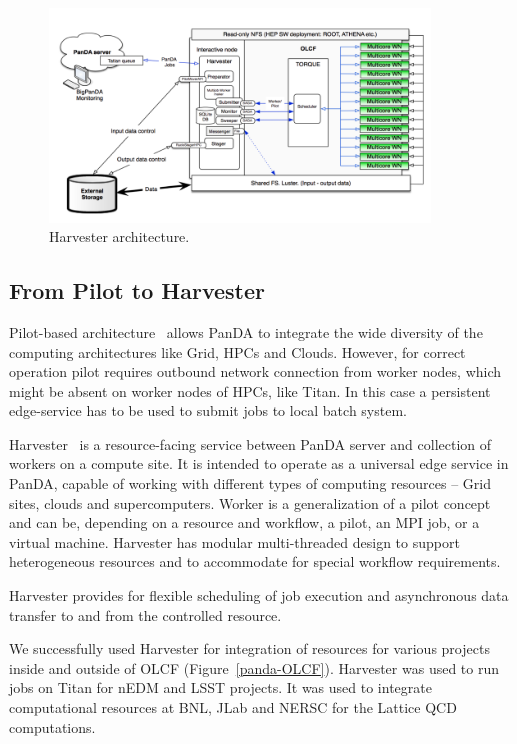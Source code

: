 \documentclass{webofc}
\begin{document}
\begin{figure}
  \centering
  \includegraphics[width=0.90\textwidth]{figures/Panda_at_OLCF.png}
  \caption{Harvester architecture.}
  \label{fig:panda-OLCF}
\end{figure}

\subsection{From Pilot to Harvester}

Pilot-based architecture~\cite{Nilsson_2008} allows PanDA to integrate the wide diversity of the computing architectures like Grid,  HPCs and Clouds. However, for correct operation pilot requires outbound network connection from worker nodes, which might be absent on worker nodes of HPCs, like Titan. In this case a persistent edge-service has to be used to submit jobs to local batch system.

Harvester~\cite{Harvester} is a resource-facing service between PanDA server and collection of workers on a compute site. It is intended to operate as a universal edge service in PanDA, capable of working with different types of computing resources -- Grid sites, clouds and supercomputers. Worker is a generalization of a pilot concept and can be, depending on a resource and workflow, a pilot, an MPI job, or a virtual machine. Harvester has modular multi-threaded design to support heterogeneous resources and to accommodate for special workflow requirements.

Harvester provides for flexible scheduling of job execution and asynchronous data transfer to and from the controlled resource.

We successfully used Harvester for integration of resources for various projects inside and outside of OLCF (Figure~\ref{panda-OLCF}). Harvester was used to run jobs on Titan for nEDM and LSST projects. It was used to integrate computational resources at BNL, JLab and NERSC for the Lattice QCD computations.
\end{document}

